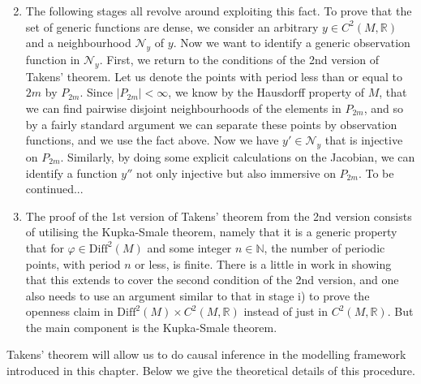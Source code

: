\documentclass[11pt, a4paper]{memoir}
\theoremstyle{break}
\theoremstyle{break}
\theoremstyle{nonumberplain}
\newcommand{\mN}{\mathbb{N}}
\newcommand{\mR}{\mathbb{R}}
\begin{document}
\begin{enumerate}[label=\roman*)]
	\setcounter{enumi}{1}
	\item The following stages all revolve around exploiting this fact. To prove that the set of generic functions are dense, we consider an arbitrary $y\in C^2(M,\mR)$ and a neighbourhood $\mathcal{N}_y$ of $y$. Now we want to identify a generic observation function in $\mathcal{N}_y$. First, we return to the conditions of the 2nd version of Takens' theorem. Let us denote the points with period less than or equal to $2m$ by $P_{2m}$. Since $|P_{2m}|<\infty$, we know by the Hausdorff property of $M$, that we can find pairwise disjoint neighbourhoods of the elements in $P_{2m}$, and so by a fairly standard argument we can separate these points by observation functions, and we use the fact above. Now we have $y'\in\mathcal{N}_y$ that is injective on $P_{2m}$. Similarly, by doing some explicit calculations on the Jacobian, we can identify a function $y''$ not only injective but also immersive on $P_{2m}$. To be continued...
	\item The proof of the 1st version of Takens' theorem from the 2nd version consists of utilising the Kupka-Smale theorem, namely that it is a generic property that for $\varphi\in \text{Diff}^2(M)$ and some integer $n\in \mN$, the number of periodic points, with period $n$ or less, is finite. There is a little in work in showing that this extends to cover the second condition of the 2nd version, and one also needs to use an argument similar to that in stage i) to prove the openness claim in $\text{Diff}^2(M)\times C^2(M,\mR)$ instead of just in $C^2(M,\mR)$. But the main component is the Kupka-Smale theorem.
\end{enumerate}  
Takens' theorem will allow us to do causal inference in the modelling framework introduced in this chapter. Below we give the theoretical details of this procedure.
\end{document}
